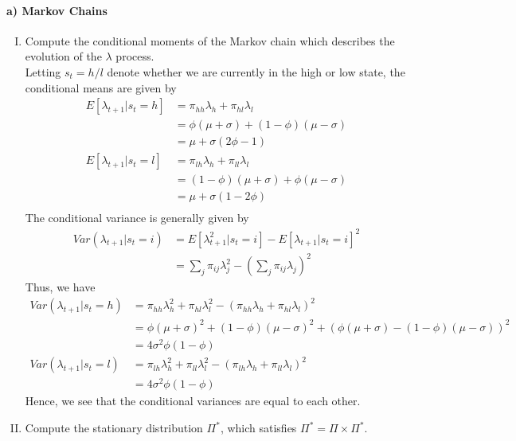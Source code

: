 \documentclass[french]{article}
\begin{document}
\paragraph{a) Markov Chains}
\begin{enumerate}[I.]
	\item Compute the conditional moments of the Markov chain which describes the evolution of the  $\lambda$ process.\\
	
	 Letting $s_t = h/l$ denote whether we are currently in the high or low state, the conditional means are given by
	\begin{equation*}
		\begin{split}
		E\left[\lambda_{t+1}|s_t = h\right] &= \pi_{hh}\lambda_h + \pi_{hl}\lambda_l \\
		&= \phi(\mu + \sigma) + (1-\phi)(\mu-\sigma)\\
		&= \mu + \sigma(2\phi -1)\\
		E\left[\lambda_{t+1}|s_t = l\right]&=\pi_{lh}\lambda_h + \pi_{ll}\lambda_l \\
		&= (1-\phi)(\mu + \sigma) + \phi(\mu-\sigma)\\
		&= \mu +\sigma(1-2\phi)\\
		\end{split}
	\end{equation*}
	The conditional variance is generally given by 
	\begin{equation*}
	\begin{split}
		Var(\lambda_{t+1}|s_t=i)&=E\left[\lambda_{t+1}^2|s_t = i\right] - E\left[\lambda_{t+1}|s_t = i\right]^2\\
		&= \sum_j \pi_{ij} \lambda_j^2 - \left(\sum_j \pi_{ij}\lambda_j\right)^2
	\end{split}
	\end{equation*}
	Thus, we have 
	\begin{equation*}
	\begin{split}
		Var(\lambda_{t+1}|s_t = h) &= \pi_{hh}\lambda_h^2 + \pi_{hl}\lambda_l^2 - (\pi_{hh}\lambda_h + \pi_{hl}\lambda_l)^2\\
		&= \phi(\mu + \sigma)^2 + (1-\phi)(\mu-\sigma)^2 + (\phi(\mu + \sigma) - (1-\phi)(\mu-\sigma))^2\\
		&= 4 \sigma ^2 \phi(1-\phi) \\
		Var(\lambda_{t+1}|s_t = l) &=\pi_{lh}\lambda_h^2 + \pi_{ll}\lambda_l^2 - (\pi_{lh}\lambda_h + \pi_{ll}\lambda_l)^2\\
		&= 4 \sigma ^2 \phi(1-\phi) 
	\end{split}
	\end{equation*}
	Hence, we see that the conditional variances are equal to each other. 
	\item Compute the stationary distribution $\Pi^*$, which satisfies $\Pi^* = \Pi \times \Pi^*$. \\
	

\end{enumerate}
\end{document}
